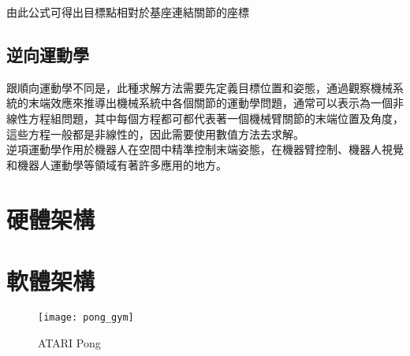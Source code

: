 由此公式可得出目標點相對於基座連結關節的座標\\

\subsection{逆向運動學}
跟順向運動學不同是，此種求解方法需要先定義目標位置和姿態，通過觀察機械系統的末端效應來推導出機械系統中各個關節的運動學問題，通常可以表示為一個非線性方程組問題，其中每個方程都可都代表著一個機械臂關節的末端位置及角度，這些方程一般都是非線性的，因此需要使用數值方法去求解。\\
逆項運動學作用於機器人在空間中精準控制末端姿態，在機器臂控制、機器人視覺和機器人運動學等領域有著許多應用的地方。\\

\section{硬體架構}
 
 \section{軟體架構}
\begin{figure}[hbt!]
\begin{center}
\texttt{[image: pong\_gym]}
\caption{\Large ATARI Pong}\label{fig.pong}
\end{center}
\end{figure} 

\newpage
